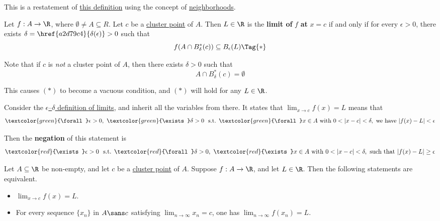 \label{dd4984e}

This is a restatement of \href{d2d461a}{this definition} using the concept of
\href{ba35f12}{neighborhoods}.

Let $f:A\to\R$, where $\emptyset\neq A\subseteq R$. Let $c$ be a
\href{b0219cd}{cluster point} of $A$. Then $L\in\R$ is the \textbf{limit of}
$f$ \textbf{at} $x=c$ if and only if for every $\epsilon>0$, there exists
$\delta=\href{a2d79c4}{\delta(\epsilon)}>0$ such that
\begin{equation*}
  f(A\cap B^*_\delta(c))\subseteq B_\epsilon(L)\Tag{*}
\end{equation*}

Note that if $c$ is \textit{not} a cluster point of $A$, then there exists
$\delta>0$ such that
$$
  A\cap B^*_\delta(c)=\emptyset
$$

This causes $(*)$ to become a vacuous condition, and $(*)$ will hold for any
$L\in\R$.

\label{cdbf269}

Consider the \href{d2d461a}{$\epsilon$–$\delta$ definition of limits}, and
inherit all the variables from there. It states that $\lim_{x\to c}f(x)=L$
means that
\begin{equation*}
  \def\g#1{\textcolor{green}{#1}}
  \g\forall\epsilon>0,\ \g\exists\delta>0\ \text{ s.t. }\g\forall x\in A\text{ with
  }0<|x-c|<\delta,\ \text{we have }|f(x)-L|<\epsilon
\end{equation*}

Then the \textbf{negation} of this statement is
\begin{equation*}
  \def\r#1{\textcolor{red}{#1}}
  \r\exists\epsilon>0\ \text{ s.t. }\r\forall\delta>0,\ \r\exists x\in A\text{ with
  }0<|x-c|<\delta,\ \text{such that }|f(x)-L|\geq\epsilon
\end{equation*}

\label{d55e07e}

Let $A\subseteq\R$ be non-empty, and let $c$ be a \href{b0219cd}{cluster point}
of $A$. Suppose $f:A\to\R$, and let $L\in\R$. Then the following statements are
equivalent.
\begin{itemize}
  \item $\displaystyle\lim_{x\to c}f(x)=L$.
  \item For every sequence $\{x_n\}$ in $A\sans c$ satisfying
        $\displaystyle\lim_{n\to\infty}x_n=c$, one has
        $\displaystyle\lim_{n\to\infty}f(x_n)=L$.
\end{itemize}

